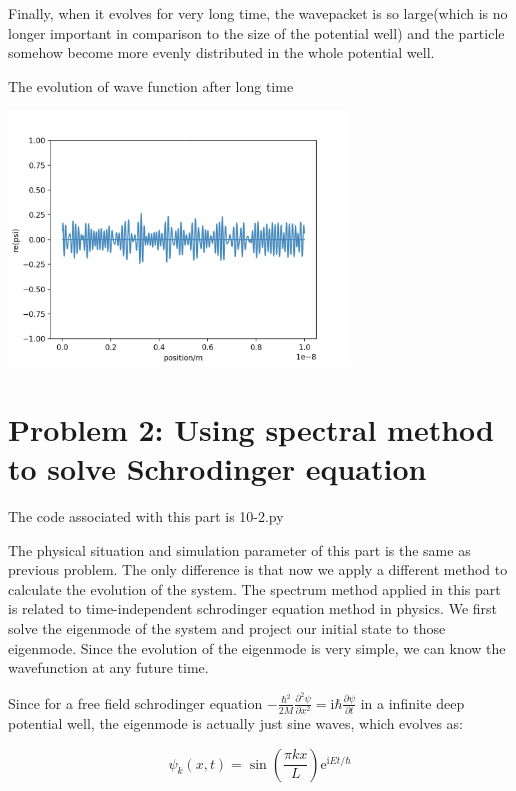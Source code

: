 \documentclass[letterpaper,12pt]{article}
\begin{document}
Finally, when it evolves for very long time, the wavepacket is so large(which is no longer important in comparison to the size of the potential well) and the particle somehow become more evenly distributed in the whole potential well.

\begin{table}[!h]
    \centering
    \caption{The evolution of wave function after long time}
    \includegraphics[width=9cm]{6}
\end{table}



\section{Problem 2: Using spectral method to solve Schrodinger equation}

The code associated with this part is 10-2.py

The physical situation and simulation parameter of this part is the same as previous problem. The only difference is that now we apply a different method to calculate the evolution of the system. The spectrum method applied in this part is related to time-independent schrodinger equation method in physics. We first solve the eigenmode of the system and project our initial state to those eigenmode. Since the evolution of the eigenmode is very simple, we can know the wavefunction at any future time.

Since for a free field schrodinger equation $-\frac{\hbar^2}{2 M} \frac{\partial^2 \psi}{\partial x^2}=\mathrm{i} \hbar \frac{\partial \psi}{\partial t}$ in a infinite deep potential well, the eigenmode is actually just sine waves, which evolves as:

\begin{equation}
    \psi_k(x, t)=\sin \left(\frac{\pi k x}{L}\right) \mathrm{e}^{\mathrm{i} E t / \hbar}
\end{equation}
\end{document}
